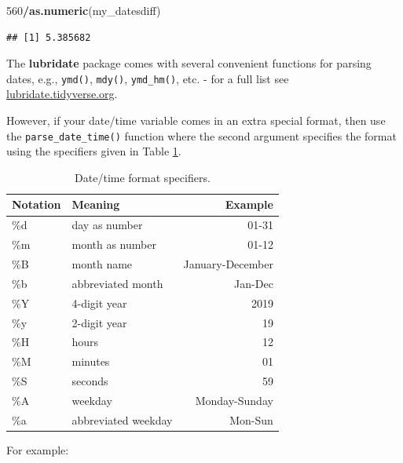 \documentclass[
  12pt,
  krantz2]{krantz}
\makeatletter
\newenvironment{Shaded}{\begin{snugshade}}{\end{snugshade}}
\newcommand{\DecValTok}[1]{\textcolor[rgb]{0.00,0.00,0.81}{#1}}
\newcommand{\KeywordTok}[1]{\textcolor[rgb]{0.13,0.29,0.53}{\textbf{#1}}}
\newcommand{\NormalTok}[1]{#1}
\newcommand{\OperatorTok}[1]{\textcolor[rgb]{0.81,0.36,0.00}{\textbf{#1}}}
\newcommand{\StringTok}[1]{\textcolor[rgb]{0.31,0.60,0.02}{#1}}
\newenvironment{kframe}{%
\medskip{}
\setlength{\fboxsep}{.8em}
 \def\at@end@of@kframe{}%
 \ifinner\ifhmode%
  \def\at@end@of@kframe{\end{minipage}}%
  \begin{minipage}{\columnwidth}%
 \fi\fi%
 \def\FrameCommand##1{\hskip\@totalleftmargin \hskip-\fboxsep
 \colorbox{shadecolor}{##1}\hskip-\fboxsep
     \hskip-\linewidth \hskip-\@totalleftmargin \hskip\columnwidth}%
 \MakeFramed {\advance\hsize-\width
   \@totalleftmargin\z@ \linewidth\hsize
   \@setminipage}}%
 {\par\unskip\endMakeFramed%
 \at@end@of@kframe}
\renewenvironment{Shaded}{\begin{kframe}}{\end{kframe}}
\makeatother
\begin{document}
\begin{Shaded}
\begin{Highlighting}[]
\DecValTok{560}\OperatorTok{/}\KeywordTok{as.numeric}\NormalTok{(my_datesdiff)}
\end{Highlighting}
\end{Shaded}

\begin{verbatim}
## [1] 5.385682
\end{verbatim}

The \textbf{lubridate} package comes with several convenient functions for parsing dates, e.g., \texttt{ymd()}, \texttt{mdy()}, \texttt{ymd\_hm()}, etc. - for a full list see \url{lubridate.tidyverse.org}.

However, if your date/time variable comes in an extra special format, then use the \texttt{parse\_date\_time()} function where the second argument specifies the format using the specifiers given in Table \ref{tab:chap2-tab-timehelpers}.

\begin{table}[!h]

\caption{\label{tab:chap2-tab-timehelpers}Date/time format specifiers.}
\centering
\fontsize{9}{11}\selectfont
\begin{tabular}[t]{llr}
\toprule
Notation & Meaning & Example\\
\midrule
\%d & day as number & 01-31\\
\%m & month as number & 01-12\\
\%B & month name & January-December\\
\%b & abbreviated month & Jan-Dec\\
\%Y & 4-digit year & 2019\\
\%y & 2-digit year & 19\\
\%H & hours & 12\\
\%M & minutes & 01\\
\%S & seconds & 59\\
\%A & weekday & Monday-Sunday\\
\%a & abbreviated weekday & Mon-Sun\\
\bottomrule
\end{tabular}
\end{table}

For example:

\begin{Shaded}
\end{Shaded}
\end{document}
